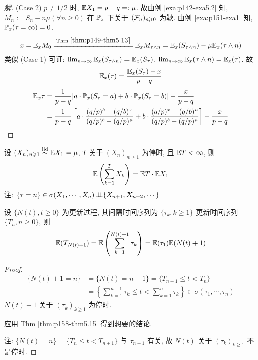 \begin{proof}[解]
(Case 2) $p\neq 1/2$ 时, $\mathbb E X_1=p-q=:\mu$. 故由例 \ref{exa:p142-exa5.2} 知, $M_n:=S_n-n\mu(\forall n\geq 0)$ 在 $\mathbb{P}_x$ 下关于 $(\mathcal{F}_n)_{n\geqslant 0}$ 为鞅. 由例 \ref{exa:p151-exa1} 知, $\mathbb{P}_x(\tau=\infty)=0$.
\[
x=\EE_x M_0\xlongequal{\text{Thm } \ref{thm:p149-thm5.13}}\EE_x M_{\tau\land n}=\EE_x(S_{\tau\land n})-\mu \EE_x(\tau\land n)
\]
类似 (Case 1) 可证: $\lim_{n \to \infty}\mathbb E_x(S_{\tau\land n})=\mathbb E_x(S_{\tau})$. $\lim_{n \to \infty}\mathbb E_x (\tau\land n)=\mathbb E_x(\tau)$. 故
\[
\mathbb E_x(\tau)=\frac{\mathbb E_x(S_{\tau})-x}{p-q}
\]
\[
\begin{aligned}
    \mathbb E_x\tau&=\frac{1}{p-q}[a\cdot\mathbb{P}_x(S_{\tau}=a)+b\cdot\mathbb{P}_x(S_{\tau}=b)]-\frac{x}{p-q}\\
    &=\frac{1}{p-q}\left[
        a\cdot \frac{(q/p)^b-(q/b)^x}{(q/p)^b-(q/p)^a}+b\cdot \frac{(q/p)^x-(q/b)^a}{(q/p)^b-(q/p)^a}
    \right]-\frac{x}{p-q}
\end{aligned}
\]
\end{proof}

\begin{theorem}[Wald等式]\label{thm:p158-thm5.15}
    设 $(X_n)_{n\geqslant 1}\overset{\text{iid}}{\sim}\mathbb E X_1=\mu$, $T$ 关于 $(X_n)_{n\geq 1}$ 为停时, 且 $\mathbb E T<\infty$, 则
    \[
    \mathbb E\left(
        \sum_{k=1}^T X_k
    \right)=\mathbb E T\cdot \mathbb E X_1
    \]
    注: $\{\tau=n\}\in \sigma(X_1,\cdots,X_n)\operatorname{\perp\!\!\!\perp} \{X_{n+1},X_{n+2},\cdots\}$
\end{theorem}

\begin{corollary}
    设 $\{N(t),t\geq 0\}$ 为更新过程, 其间隔时间序列为 $\{\tau_k,k\geq 1\}$ 更新时间序列 $\{T_n,n\geq 0\}$, 则
    \[
    \mathbb E(T_{N(t)+1})=\mathbb E \left(
        \sum_{k=1}^{N(t)+1}\tau_k
    \right)=\mathbb E (\tau_1)\mathbb E(N(t)+1)
    \]
\end{corollary}

\begin{proof}
    \[
    \begin{aligned}
        \{N(t)+1=n\} &=\{N(t)=n-1\}=\{T_{n-1}\leq t< T_n\}\\
        &=\left\{
            \sum_{k=1}^{n-1}\tau_k\leq t<\sum_{k=1}^n\tau_k
        \right\}\in\sigma(\tau_1,\cdots,\tau_n)
    \end{aligned}
    \]
    $N(t)+1$ 关于 $(\tau_k)_{k\geq 1}$ 为停时.

    应用 Thm \ref{thm:p158-thm5.15} 得到想要的结论.

    注: $\{N(t)=n\}=\{T_n\leq t<T_{n+1}\}$ 与 $\tau_{n+1}$ 有关, 故 $N(t)$ 关于 $(\tau_k)_{k\geq 1}$ 不是停时.
\end{proof}
\newpage